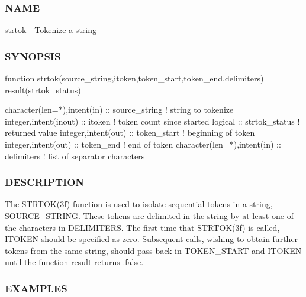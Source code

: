 \subsubsection*{N\+A\+ME}

strtok -\/ Tokenize a string \subsubsection*{S\+Y\+N\+O\+P\+S\+IS}

function strtok(source\+\_\+string,itoken,token\+\_\+start,token\+\_\+end,delimiters) result(strtok\+\_\+status)

character(len=$\ast$),intent(in) \+:\+: source\+\_\+string ! string to tokenize integer,intent(inout) \+:\+: itoken ! token count since started logical \+:\+: strtok\+\_\+status ! returned value integer,intent(out) \+:\+: token\+\_\+start ! beginning of token integer,intent(out) \+:\+: token\+\_\+end ! end of token character(len=$\ast$),intent(in) \+:\+: delimiters ! list of separator characters

\subsubsection*{D\+E\+S\+C\+R\+I\+P\+T\+I\+ON}

The S\+T\+R\+T\+O\+K(3f) function is used to isolate sequential tokens in a string, S\+O\+U\+R\+C\+E\+\_\+\+S\+T\+R\+I\+NG. These tokens are delimited in the string by at least one of the characters in D\+E\+L\+I\+M\+I\+T\+E\+RS. The first time that S\+T\+R\+T\+O\+K(3f) is called, I\+T\+O\+K\+EN should be specified as zero. Subsequent calls, wishing to obtain further tokens from the same string, should pass back in T\+O\+K\+E\+N\+\_\+\+S\+T\+A\+RT and I\+T\+O\+K\+EN until the function result returns .false. \subsubsection*{E\+X\+A\+M\+P\+L\+ES}

